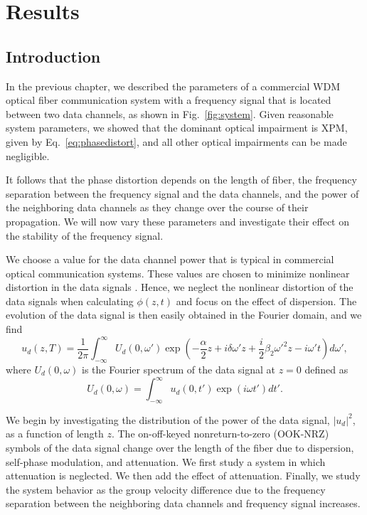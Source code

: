 \chapter{Results}
\label{chap:results}

\section{Introduction}

In the previous chapter, we described the parameters of a commercial WDM optical fiber communication system with a frequency signal that is located between two data channels, as shown in Fig.~\ref{fig:system}. Given reasonable system parameters, we showed that the dominant optical impairment is XPM, given by Eq.~\ref{eq:phasedistort}, and all other optical impairments can be made negligible.

It follows that the phase distortion depends on the length of fiber, the frequency separation between the frequency signal and the data channels, and the power of the neighboring data channels as they change over the course of their propagation. We will now vary these parameters and investigate their effect on the stability of the frequency signal.

We choose a value for the data channel power that is typical in commercial optical communication systems. These values are chosen to minimize nonlinear distortion in the data signals \cite{Agrawal2013, agrawal2012fiber}. Hence, we neglect the nonlinear distortion of the data signals when calculating $\phi(z,t)$ and focus on the effect of dispersion. The evolution of the data signal is then easily obtained in the Fourier domain, and we find
%
\begin{equation} \label{eq:datasol}
u_d(z,T) = \frac{1}{2\pi} \int_{-\infty}^{\infty} U_d(0, \omega')\exp\left(-\frac{\alpha}{2} z + i\delta\omega' z + \frac{i}{2}\beta_2\omega'^2z-i\omega' t\right) d\omega' ,
\end{equation}
%
where $U_d(0,\omega)$ is the Fourier spectrum of the data signal at $z=0$ defined as
\begin{equation}
U_d(0,\omega) = \int_{-\infty}^{\infty} u_d(0, t')\exp(i\omega t')dt'.
\end{equation}

We begin by investigating the distribution of the power of the data signal, $|u_d|^2$, as a function of length $z$. The on-off-keyed nonreturn-to-zero (OOK-NRZ) symbols of the data signal change over the length of the fiber due to dispersion, self-phase modulation, and attenuation. We first study a system in which attenuation is neglected. We then add the effect of attenuation. Finally, we study the system behavior as the group velocity difference due to the frequency separation between the neighboring data channels and frequency signal increases.

